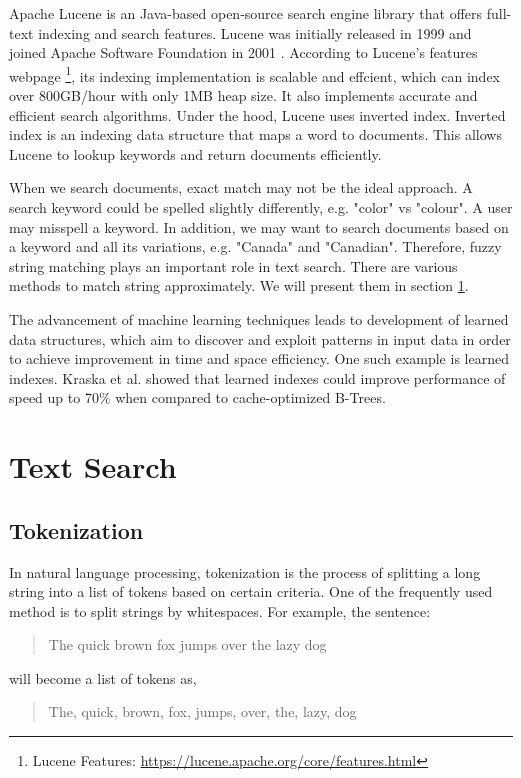 Apache Lucene is an Java-based open-source search engine library that offers full-text indexing and search features.
Lucene was initially released in 1999 and joined Apache Software Foundation in 2001 \cite{McCandless2010}.
According to Lucene's features webpage \footnote{Lucene Features: \url{https://lucene.apache.org/core/features.html}}, 
its indexing implementation is scalable and effcient,  which can index over 800GB/hour with only 1MB heap size.
It also implements accurate and efficient search algorithms. Under the hood, Lucene uses inverted index.
Inverted index is an indexing data structure that maps a word to documents. This allows Lucene to lookup keywords and return documents efficiently.

When we search documents, exact match may not be the ideal approach. A search keyword could be spelled slightly differently, e.g. "color" vs "colour".
A user may misspell a keyword. In addition, we may want to search documents based on a keyword and all its variations, e.g. "Canada" and "Canadian".
Therefore, fuzzy string matching plays an important role in text search. There are various methods to match string approximately. We will present them in section \ref{background:textsearch}.

The advancement of machine learning techniques leads to development of learned data structures, 
which aim to discover and exploit patterns in input data in order to achieve improvement in time and space efficiency.
One such example is learned indexes. Kraska et al. \cite{kraska2018case} showed that learned indexes could improve performance of speed up to 70\% 
when compared to cache-optimized B-Trees.

\section{Text Search}
\label{background:textsearch}

\subsection{Tokenization}

In natural language processing, tokenization is the process of splitting a long string into a list of tokens based on certain criteria.
One of the frequently used method is to split strings by whitespaces. For example, the sentence:
\begin{quote}
The quick brown fox jumps over the lazy dog
\end{quote}
will become a list of tokens as,
\begin{quote}
	The, quick, brown, fox, jumps, over, the, lazy, dog
\end{quote}

